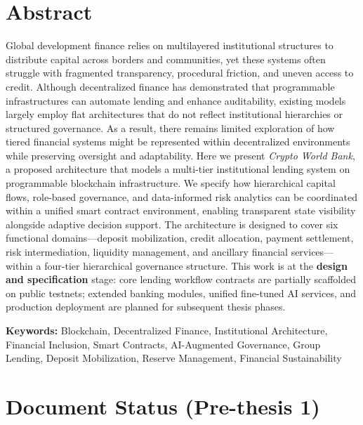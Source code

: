 \documentclass[12pt,a4paper]{report}
\begin{document}
\chapter*{Abstract}
{}

Global development finance relies on multilayered institutional structures to distribute capital across borders and communities, yet these systems often struggle with fragmented transparency, procedural friction, and uneven access to credit. Although decentralized finance has demonstrated that programmable infrastructures can automate lending and enhance auditability, existing models largely employ flat architectures that do not reflect institutional hierarchies or structured governance. As a result, there remains limited exploration of how tiered financial systems might be represented within decentralized environments while preserving oversight and adaptability. Here we present \textit{Crypto World Bank}, a proposed architecture that models a multi-tier institutional lending system on programmable blockchain infrastructure. We specify how hierarchical capital flows, role-based governance, and data-informed risk analytics can be coordinated within a unified smart contract environment, enabling transparent state visibility alongside adaptive decision support. The architecture is designed to cover six functional domains---deposit mobilization, credit allocation, payment settlement, risk intermediation, liquidity management, and ancillary financial services---within a four-tier hierarchical governance structure. This work is at the \textbf{design and specification} stage: core lending workflow contracts are partially scaffolded on public testnets; extended banking modules, unified fine-tuned AI services, and production deployment are planned for subsequent thesis phases.

\vspace{0.5em}
\noindent\textbf{Keywords:} Blockchain, Decentralized Finance, Institutional Architecture, Financial Inclusion, Smart Contracts, AI-Augmented Governance, Group Lending, Deposit Mobilization, Reserve Management, Financial Sustainability

\newpage
\thispagestyle{empty}

\chapter*{Document Status (Pre-thesis 1)}
{}
\end{document}
